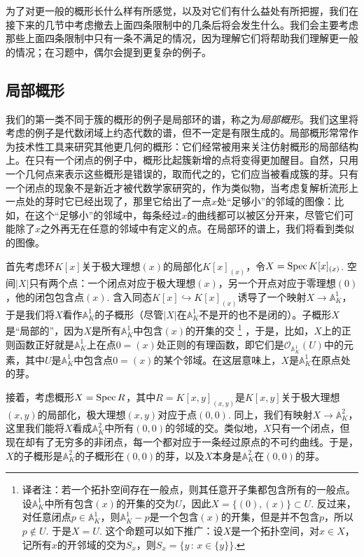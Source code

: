 为了对更一般的概形长什么样有所感觉，以及对它们有什么益处有所把握，我们在接下来的几节中考虑撤去上面四条限制中的几条后将会发生什么。我们会主要考虑那些上面四条限制中只有一条不满足的情况，因为理解它们将帮助我们理解更一般的情况；在习题中，偶尔会提到更复杂的例子。

\subsection{局部概形}

我们的第一类不同于簇的概形的例子是局部环的谱，称之为\textit{局部概形}。我们这里将考虑的例子是代数闭域上约态代数的谱，但不一定是有限生成的。局部概形常常作为技术性工具来研究其他更几何的概形：它们经常被用来关注仿射概形的局部结构上。在只有一个闭点的例子中，概形比起簇新增的点将变得更加醒目。自然，只用一个几何点来表示这些概形是错误的，取而代之的，它们应当被看成簇的芽。只有一个闭点的现象不是新近才被代数学家研究的，作为类似物，当考虑复解析流形上一点处的芽时它已经出现了，那里它给出了一点$x$处“足够小”的邻域的图像：比如，在这个“足够小”的邻域中，每条经过$x$的曲线都可以被区分开来，尽管它们可能除了$x$之外再无在任意的邻域中有定义的点。在局部环的谱上，我们将看到类似的图像。

首先考虑环$K[x]$关于极大理想$(x)$的局部化$K[x]_{(x)}$，令$X=\operatorname{Spec} K[x]_{(x)}$. 空间$|X|$只有两个点：一个闭点对应于极大理想$(x)$，另一个开点对应于零理想$(0)$，他的闭包包含点$(x)$. 含入同态$K[x]\hookrightarrow K[x]_{(x)}$诱导了一个映射$X\to \mathbb{A}_K^1$，于是我们将$X$看作$\mathbb{A}_K^1$的子概形（尽管$|X|$在$\mathbb{A}_K^1$不是开的也不是闭的）。子概形$X$是“局部的”，因为$X$是所有$\mathbb{A}_K^1$中包含$(x)$的开集的交%
\footnote{译者注：若一个拓扑空间存在一般点，则其任意开子集都包含所有的一般点。设$\mathbb{A}_K^1$中所有包含$(x)$的开集的交为$U$，因此$X=\{(0),(x)\}\subset U$. 反过来，对任意闭点$p\in \mathbb{A}_K^1$，则$\mathbb{A}_K^1-p$是一个包含$(x)$的开集，但是并不包含$p$，所以$p\not\in U$. 于是$X=U$. 这个命题可以如下推广：设$X$是一个拓扑空间，对$x\in X$，记所有$x$的开邻域的交为$S_x$，则$S_x=\{y\,:\, x\in \overline{\{y\}}\}$.}%
，于是，比如，$X$上的正则函数正好就是$\mathbb{A}_K^1$上在点$0=(x)$处正则的有理函数，即它们是$\mathscr{O}_{\mathbb{A}_K^1}(U)$中的元素，其中$U$是$\mathbb{A}_K^1$中包含点$0=(x)$的某个邻域。在这层意味上，$X$是$\mathbb{A}_K^1$在原点处的芽。

接着，考虑概形$X=\operatorname{Spec} R$，其中$R=K[x,y]_{(x,y)}$是$K[x,y]$关于极大理想$(x,y)$的局部化，极大理想$(x,y)$对应于点$(0,0)$. 同上，我们有映射$X\to \mathbb{A}_K^2$，这里我们能将$X$看成$\mathbb{A}_K^2$中所有$(0,0)$的邻域的交。类似地，$X$只有一个闭点，但现在却有了无穷多的非闭点，每一个都对应于一条经过原点的不可约曲线。于是，$X$的子概形是$\mathbb{A}_K^2$的子概形在$(0,0)$的芽，以及$X$本身是$\mathbb{A}_K^2$在$(0,0)$的芽。

